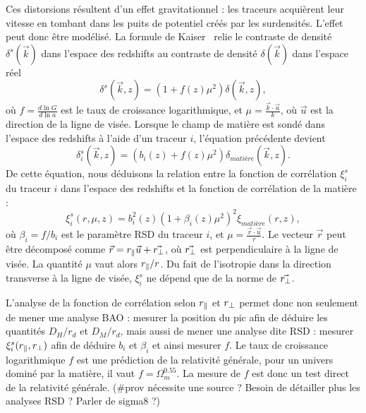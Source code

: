 \documentclass[11pt, twoside, a4paper, openright]{report}
\begin{document}
Ces distorsions résultent d'un effet gravitationnel : les traceurs acquièrent leur vitesse en tombant dans les puits de potentiel créés par les surdensités. L'effet peut donc être modélisé. La formule de Kaiser~\cite{CITE} relie le contraste de densité $\delta^s(\vec k)$ dans l'espace des redshifts au contraste de densité $\delta(\vec k)$ dans l'espace réel
\begin{equation}
  \label{eq:kaiser}
  \delta^{s}(\vec k, z) = (1 + f(z) \mu^2) \delta(\vec k, z) ,
\end{equation}
où $f = \frac{d \ln{G}}{d \ln{a}}$ est le taux de croissance logarithmique, et $\mu = \frac{\vec k \cdot \vec u}{k}$, où $\vec u$ est la direction de la ligne de visée. Lorsque le champ de matière est sondé dans l'espace des redshifts à l'aide d'un traceur $i$, l'équation précédente devient
\begin{equation}
  \label{eq:kaiser2}
  \delta_i^{s}(\vec k, z) = (b_i(z) + f(z) \mu^2) \delta_{matière}(\vec k, z) .
\end{equation}
De cette équation, nous déduisons la relation entre la fonction de corrélation $\xi_{i}^{s}$ du traceur $i$ dans l'espace des redshifts et la fonction de corrélation de la matière :
\begin{equation}
  \label{eq:kaiser3}
  \xi_{i}^s(r, \mu, z) = b_{i}^2(z)(1 + \beta_i(z) \mu^2)^2 \xi_{matière}(r, z) ,
\end{equation}
où $\beta_i = f / b_i$ est le paramètre RSD du traceur $i$, et $\mu =\frac{\vec r \cdot \vec u}{r}$. Le vecteur $\vec r$ peut être décomposé comme $\vec r = r_{\parallel}{} \vec u + \vec {r_{\perp}}{}$, où $\vec {r_{\perp}}{}$ est perpendiculaire à la ligne de visée. La quantité $\mu$ vaut alors $r_{\parallel}{} / r$. Du fait de l'isotropie dans la direction transverse à la ligne de visée, $\xi_i^s$ ne dépend que de la norme de $\vec {r_{\perp}}{}$.

L'analyse de la fonction de corrélation selon $r_{\parallel}{}$ et $r_{\perp}{}$ permet donc non seulement de mener une analyse BAO : mesurer la position du pic afin de déduire les quantités $D_{H} / r_d$ et $D_{M} / r_d$, mais aussi de mener une analyse dite RSD : mesurer $\xi_i^s(r_{\parallel}{}, r_{\perp}{})$ afin de déduire $b_i$ et $\beta_i$ et ainsi mesurer $f$. Le taux de croissance logarithmique $f$ est une prédiction de la relativité générale, pour un univers dominé par la matière, il vaut $f = \Omega_{m}^{0.55}$. La mesure de $f$ est donc un test direct de la relativité générale. (\#prov nécessite une source ? Besoin de détailler plus les analyses RSD ? Parler de sigma8 ?)
\end{document}
